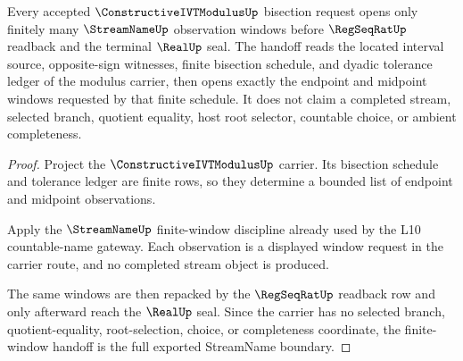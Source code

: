 \begin{theorem}
\label{thm:streamname-constructive-ivt-modulus-window-handoff}
Every accepted $\ConstructiveIVTModulusUp$ bisection request opens only finitely many $\StreamNameUp$ observation windows before $\RegSeqRatUp$ readback and the terminal $\RealUp$ seal. The handoff reads the located interval source, opposite-sign witnesses, finite bisection schedule, and dyadic tolerance ledger of the modulus carrier, then opens exactly the endpoint and midpoint windows requested by that finite schedule. It does not claim a completed stream, selected branch, quotient equality, host root selector, countable choice, or ambient completeness.
\end{theorem}
\begin{proof}
Project the $\ConstructiveIVTModulusUp$ carrier. Its bisection schedule and tolerance ledger are finite rows, so they determine a bounded list of endpoint and midpoint observations.

Apply the $\StreamNameUp$ finite-window discipline already used by the L10 countable-name gateway. Each observation is a displayed window request in the carrier route, and no completed stream object is produced.

The same windows are then repacked by the $\RegSeqRatUp$ readback row and only afterward reach the $\RealUp$ seal. Since the carrier has no selected branch, quotient-equality, root-selection, choice, or completeness coordinate, the finite-window handoff is the full exported StreamName boundary.
\end{proof}

